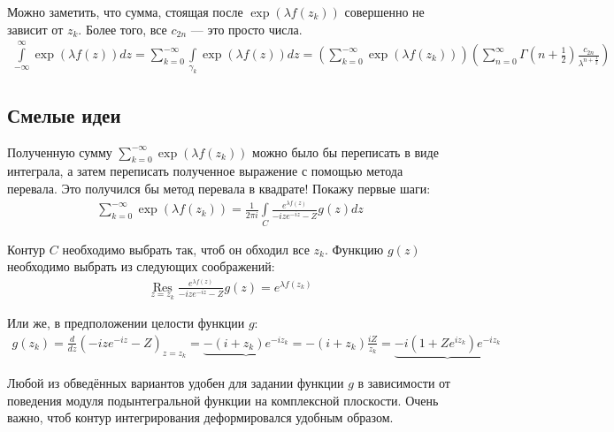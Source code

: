 \documentclass[a4paper, 12pt]{article}
\DeclareMathOperator*{\Res}{Res}
\begin{document}
Можно заметить, что сумма, стоящая после $\exp\left(\lambda f(z_k)\right)$ совершенно не зависит от $z_k$. Более того, все $c_{2n}$ --- это просто числа. 
\begin{equation}
\begin{aligned}
    \int\limits_{-\infty}^{\infty} \exp\left(\lambda f(z)\right) dz = 
    \sum\limits_{k=0}^{-\infty}\int\limits_{\gamma_k} \exp\left(\lambda f(z)\right) dz 
    = \left(\sum\limits_{k=0}^{-\infty}\exp\left(\lambda f(z_k)\right)\right)\left(\sum\limits_{n=0}^{\infty} \Gamma\left(n+\frac{1}{2}\right)\frac{c_{2n}}{\lambda^{n+\frac{1}{2}}}\right)
\end{aligned}
\end{equation}
\subsection*{Смелые идеи}
Полученную сумму $\sum\limits_{k=0}^{-\infty}\exp\left(\lambda f(z_k)\right)$ можно было бы переписать в виде интеграла, а затем переписать полученное выражение с помощью метода перевала. Это получился бы метод перевала в квадрате! Покажу первые шаги:
\begin{equation}
\begin{aligned}
    \sum\limits_{k=0}^{-\infty}\exp\left(\lambda f(z_k)\right) = 
    \frac{1}{2\pi i}\int\limits_C \frac{e^{\lambda f(z)}}{-ize^{-iz}-Z} g(z)dz
\end{aligned}
\end{equation}

Контур $C$ необходимо выбрать так, чтоб он обходил все $z_k$. Функцию $g(z)$ необходимо выбрать из следующих соображений:
\begin{equation}
\begin{aligned}
    \Res\limits_{z=z_k} \frac{e^{\lambda f(z)}}{-ize^{-iz}-Z} g(z) = e^{\lambda f(z_k)}
\end{aligned}
\end{equation}

Или же, в предположении целости функции $g$:
\begin{equation}
\begin{aligned}
    g(z_k) = \frac{d}{dz}\left(-ize^{-iz}-Z\right)_{z=z_k}  = \underbrace{-(i+z_k)e^{-iz_k}} = -(i+z_k)\frac{iZ}{z_k} = \underbrace{-i(1+Ze^{i z_k})e^{-iz_k}}
\end{aligned}
\end{equation}

Любой из обведённых вариантов удобен для задании функции $g$ в зависимости от поведения модуля подынтегральной функции на комплексной плоскости. Очень важно, чтоб контур интегрирования деформировался удобным образом.
\end{document}
